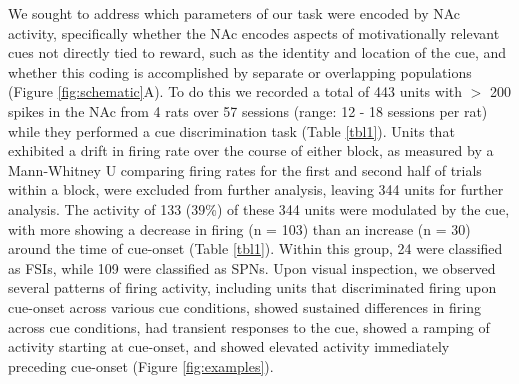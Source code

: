 \documentclass[11pt]{article}
\begin{document}
We sought to address which parameters of our task were encoded by NAc
activity, specifically whether the NAc encodes aspects of
motivationally relevant cues not directly tied to reward, such as the
identity and location of the cue, and whether this coding is
accomplished by separate or overlapping populations (Figure
\ref{fig:schematic}A). To do this we recorded a total of 443 units
with $>$ 200 spikes in the NAc from 4 rats over 57 sessions (range: 12
- 18 sessions per rat) while they performed a cue discrimination task
(Table \ref{tbl1}). Units that exhibited a drift in firing rate over
the course of either block, as measured by a Mann-Whitney U comparing
firing rates for the first and second half of trials within a block,
were excluded from further analysis, leaving 344 units for further
analysis. The activity of 133 (39\%) of these 344 units were modulated
by the cue, with more showing a decrease in firing (n = 103) than an
increase (n = 30) around the time of cue-onset (Table
\ref{tbl1}). Within this group, 24 were classified as FSIs, while 109
were classified as SPNs. Upon visual inspection, we observed several
patterns of firing activity, including units that discriminated firing
upon cue-onset across various cue conditions, showed sustained
differences in firing across cue conditions, had transient responses
to the cue, showed a ramping of activity starting at cue-onset, and
showed elevated activity immediately preceding cue-onset (Figure
\ref{fig:examples}).
\end{document}
